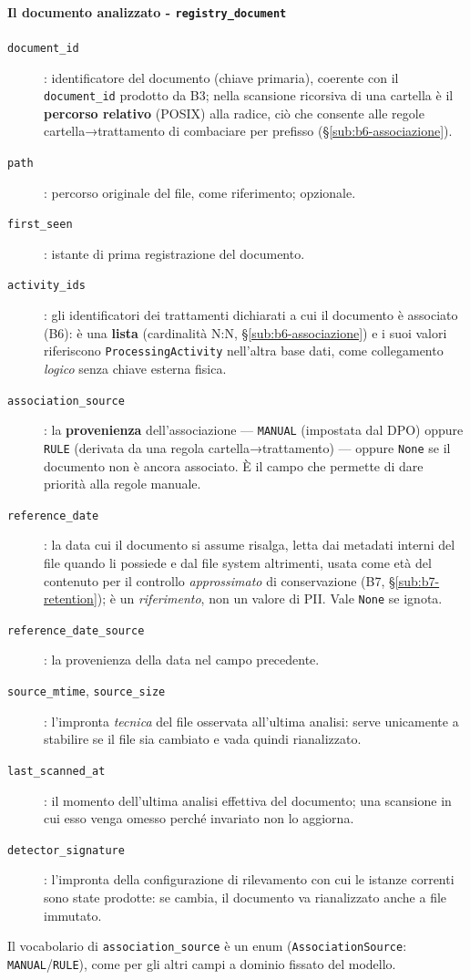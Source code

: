 \paragraph*{Il documento analizzato - \texttt{registry\_document}}
\begin{description}
	\item[\texttt{document\_id}]: identificatore del documento (chiave primaria), coerente con il \texttt{document\_id} prodotto da B3; nella scansione ricorsiva di una cartella è il \textbf{percorso relativo} (POSIX) alla radice, ciò che consente alle regole cartella→trattamento di combaciare per prefisso (§\ref{sub:b6-associazione}).
	\item[\texttt{path}]: percorso originale del file, come riferimento; opzionale.
	\item[\texttt{first\_seen}]: istante di prima registrazione del documento.
	\item[\texttt{activity\_ids}]: gli identificatori dei trattamenti dichiarati a cui il documento è associato (B6): è una \textbf{lista} (cardinalità N:N, §\ref{sub:b6-associazione}) e i suoi valori riferiscono \texttt{ProcessingActivity} nell'altra base dati, come collegamento \emph{logico} senza chiave esterna fisica.
	\item[\texttt{association\_source}]: la \textbf{provenienza} dell'associazione --- \texttt{MANUAL} (impostata dal DPO) oppure \texttt{RULE} (derivata da una regola cartella→trattamento) --- oppure \texttt{None} se il documento non è ancora associato. È il campo che permette di dare priorità alla regole manuale.
	\item[\texttt{reference\_date}]: la data cui il documento si assume risalga, letta dai metadati interni del file quando li possiede e dal file system altrimenti, usata come età del contenuto per il controllo \emph{approssimato} di conservazione (B7, §\ref{sub:b7-retention}); è un \emph{riferimento}, non un valore di PII. Vale \texttt{None} se ignota.
	\item[\texttt{reference\_date\_source}]: la provenienza della data nel campo precedente.
	\item[\texttt{source\_mtime}, \texttt{source\_size}]: l'impronta \emph{tecnica} del file osservata all'ultima analisi: serve unicamente a stabilire se il file sia cambiato e vada quindi rianalizzato.
	\item[\texttt{last\_scanned\_at}]: il momento dell'ultima analisi effettiva del documento; una scansione in cui esso venga omesso perché invariato non lo aggiorna.
	\item[\texttt{detector\_signature}]: l'impronta della configurazione di rilevamento con cui le istanze correnti sono state prodotte: se cambia, il documento va rianalizzato anche a file immutato.
\end{description}
Il vocabolario di \texttt{association\_source} è un enum (\texttt{AssociationSource}: \texttt{MANUAL}/\texttt{RULE}), come per gli altri campi a dominio fissato del modello.

